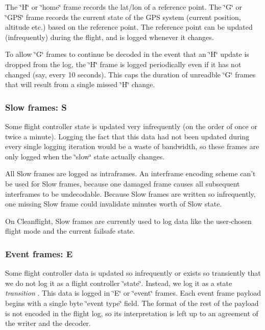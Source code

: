 The \char`\"{}\+H\char`\"{} or \char`\"{}home\char`\"{} frame records the lat/lon of a reference point. The \char`\"{}\+G\char`\"{} or \char`\"{}\+G\+P\+S\char`\"{} frame records the current state of the G\+P\+S system (current position, altitude etc.) based on the reference point. The reference point can be updated (infrequently) during the flight, and is logged whenever it changes.

To allow \char`\"{}\+G\char`\"{} frames to continue be decoded in the event that an \char`\"{}\+H\char`\"{} update is dropped from the log, the \char`\"{}\+H\char`\"{} frame is logged periodically even if it has not changed (say, every 10 seconds). This caps the duration of unreadble \char`\"{}\+G\char`\"{} frames that will result from a single missed \char`\"{}\+H\char`\"{} change.

\subsubsection*{Slow frames\+: S}

Some flight controller state is updated very infrequently (on the order of once or twice a minute). Logging the fact that this data had not been updated during every single logging iteration would be a waste of bandwidth, so these frames are only logged when the \char`\"{}slow\char`\"{} state actually changes.

All Slow frames are logged as intraframes. An interframe encoding scheme can't be used for Slow frames, because one damaged frame causes all subsequent interframes to be undecodable. Because Slow frames are written so infrequently, one missing Slow frame could invalidate minutes worth of Slow state.

On Cleanflight, Slow frames are currently used to log data like the user-\/chosen flight mode and the current failsafe state.

\subsubsection*{Event frames\+: E}

Some flight controller data is updated so infrequently or exists so transiently that we do not log it as a flight controller \char`\"{}state\char`\"{}. Instead, we log it as a state {\itshape transition} . This data is logged in \char`\"{}\+E\char`\"{} or \char`\"{}event\char`\"{} frames. Each event frame payload begins with a single byte \char`\"{}event type\char`\"{} field. The format of the rest of the payload is not encoded in the flight log, so its interpretation is left up to an agreement of the writer and the decoder.


